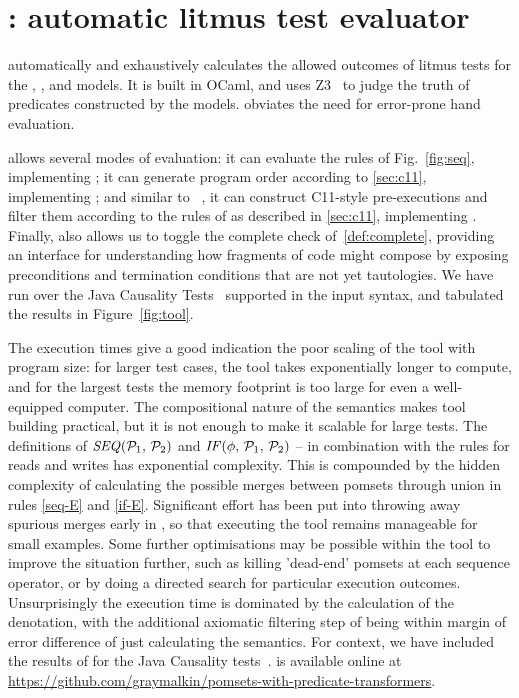 \section{\PwTerTITLE: automatic litmus test evaluator}
\label{sec:tool}

\PwTer{} automatically and exhaustively calculates the allowed outcomes of litmus tests for the \PwT, \PwTpo, and \PwTc{} models. It is built in OCaml, and uses Z3~\cite{Z3Solver} to judge the truth of predicates constructed by the models. \PwTer{} obviates the need for error-prone hand evaluation.

\PwTer{} allows several modes of evaluation: it can evaluate the rules of Fig.~\ref{fig:seq}, implementing \PwT; it can generate program order according to \textsection\ref{sec:c11}, implementing \PwTpo; and similar to \MRD~\cite{DBLP:conf/esop/PaviottiCPWOB20}, it can construct C11-style pre-executions and filter them according to the rules of \rcXI{} as described in \textsection\ref{sec:c11}, implementing \PwTc{}.
Finally, \PwTer{} also allows us to toggle the complete check of~\ref{def:complete}, providing an interface for understanding how fragments of code might compose by exposing preconditions and termination conditions that are not yet tautologies.
We have run \PwTer{} over the Java Causality Tests~\cite{PughWebsite} supported in the input syntax, and tabulated the results in Figure~\ref{fig:tool}.

The execution times give a good indication the poor scaling of the tool with program size: for larger test cases, the tool takes exponentially longer to compute, and for the largest tests the memory footprint is too large for even a well-equipped computer.
The compositional nature of the semantics makes tool building practical, but it is not enough to make it scalable for large tests.
The definitions of $\sSEMI{\aPSS_1}{\aPSS_2}$ and $\sIF{\aForm}\sTHEN\aPSS_1\sELSE\aPSS_2\sFI$ -- in combination with the rules for reads and writes has exponential complexity.
This is compounded by the hidden complexity of calculating the possible merges between pomsets through union in rules \ref{seq-E} and \ref{if-E}.
Significant effort has been put into throwing away spurious merges early in \PwTer, so that executing the tool remains manageable for small examples.
Some further optimisations may be possible within the tool to improve the situation further, such as killing 'dead-end' pomsets at each sequence operator, or by doing a directed search for particular execution outcomes.
Unsurprisingly the execution time is dominated by the calculation of the denotation, with the additional axiomatic filtering step of \PwTc{} being within margin of error difference of just calculating the \PwT{} semantics.
For context, we have included the results of \MRD{} for the Java Causality tests~\cite{DBLP:conf/esop/PaviottiCPWOB20}.
\PwTer{} is available online at \url{https://github.com/graymalkin/pomsets-with-predicate-transformers}.

